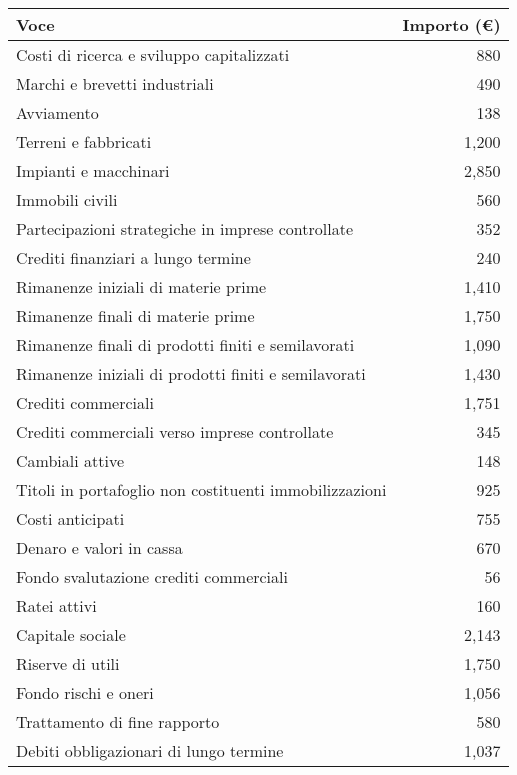 \documentclass{book}
\begin{document}
\newpage
\enlargethispage{\baselineskip}
\setlength{\extrarowheight}{1pt} %
\normalsize
\centering
\begin{longtable}{|l|r|}
    \hline
    \textbf{Voce} & \textbf{Importo (€)} \\
    \hline
    Costi di ricerca e sviluppo capitalizzati & 880 \\
    \hline
    Marchi e brevetti industriali & 490 \\
    \hline
    Avviamento & 138 \\
    \hline
    Terreni e fabbricati & 1,200 \\
    \hline
    Impianti e macchinari & 2,850 \\
    \hline
    Immobili civili & 560 \\
    \hline
    Partecipazioni strategiche in imprese controllate & 352 \\
    \hline
    Crediti finanziari a lungo termine & 240 \\
    \hline
    Rimanenze iniziali di materie prime & 1,410 \\
    \hline
    Rimanenze finali di materie prime & 1,750 \\
    \hline
    Rimanenze finali di prodotti finiti e semilavorati & 1,090 \\
    \hline
    Rimanenze iniziali di prodotti finiti e semilavorati & 1,430 \\
    \hline
    Crediti commerciali & 1,751 \\
    \hline
    Crediti commerciali verso imprese controllate & 345 \\
    \hline
    Cambiali attive & 148 \\
    \hline
    Titoli in portafoglio non costituenti immobilizzazioni & 925 \\
    \hline
    Costi anticipati & 755 \\
    \hline
    Denaro e valori in cassa & 670 \\
    \hline
    Fondo svalutazione crediti commerciali & 56 \\
    \hline
    Ratei attivi & 160 \\
    \hline
    Capitale sociale & 2,143 \\
    \hline
    Riserve di utili & 1,750 \\
    \hline
    Fondo rischi e oneri & 1,056 \\
    \hline
    Trattamento di fine rapporto & 580 \\
    \hline
    Debiti obbligazionari di lungo termine & 1,037 \\

\end{longtable}
\end{document}
